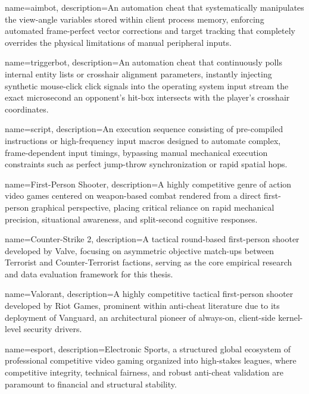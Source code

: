 {
    name=aimbot,
    description={An automation cheat that systematically manipulates the view-angle variables stored within client process memory, enforcing automated frame-perfect vector corrections and target tracking that completely overrides the physical limitations of manual peripheral inputs.}
}

{
    name=triggerbot,
    description={An automation cheat that continuously polls internal entity lists or crosshair alignment parameters, instantly injecting synthetic mouse-click click signals into the operating system input stream the exact microsecond an opponent's hit-box intersects with the player's crosshair coordinates.}
}

{
    name=script,
    description={An execution sequence consisting of pre-compiled instructions or high-frequency input macros designed to automate complex, frame-dependent input timings, bypassing manual mechanical execution constraints such as perfect jump-throw synchronization or rapid spatial hops.}
}

{
    name=First-Person Shooter,
    description={A highly competitive genre of action video games centered on weapon-based combat rendered from a direct first-person graphical perspective, placing critical reliance on rapid mechanical precision, situational awareness, and split-second cognitive responses.}
}

{
    name=Counter-Strike 2,
    description={A tactical round-based first-person shooter developed by Valve, focusing on asymmetric objective match-ups between Terrorist and Counter-Terrorist factions, serving as the core empirical research and data evaluation framework for this thesis.}
}

{
    name=Valorant,
    description={A highly competitive tactical first-person shooter developed by Riot Games, prominent within anti-cheat literature due to its deployment of Vanguard, an architectural pioneer of always-on, client-side kernel-level security drivers.}
}

{
    name=esport,
    description={Electronic Sports, a structured global ecosystem of professional competitive video gaming organized into high-stakes leagues, where competitive integrity, technical fairness, and robust anti-cheat validation are paramount to financial and structural stability.}
}


